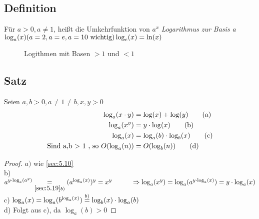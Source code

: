 \subsection{Definition}
Für $a > 0, a \neq 1$, hei\ss t die Umkehrfunktion von $a^x$ \emph{Logarithmus zur Basis a} \\
$\log_a (x) \hfill (a =2,a=e,a=10 \text{ wichtig})\\
\log_e (x) = \ln (x)\\
$
\begin{figure}[h!]
\centering
{}
\caption{Logithmen mit Basen $>1$ und $<1$}
\end{figure}
\subsection[Satz]{Satz}
Seien $a,b > 0 , a \neq 1 \neq b , x , y > 0$
\begin{align}
\log_a(x\cdot y) &= \log(x) + \log(y) \tag{a}\\
\log_a(x^y) &= y \cdot \log(x) \tag{b}\\
\log_a(x) &= \log_a(b) \cdot \log_b(x) \tag{c}\\
\text{Sind a,b > 1 , so } O(\log_a(n)) &= O(\log_b(n)) \tag{d}
\end{align}
\begin{proof}
$a)$ wie \ref{sec:5.10}\\
b) $a^{y \cdot \log_a(a^y)} \underset{\ref{sec:5.19}b)}{=}(a^{\log_a(x)})^{y} = x^y\\
\hspace*{1cm} \Rightarrow \log_a(x^y) = \log_a(a^{y \cdot \log_a(x)}) = y \cdot \log_a(x)$\\
c) $\log_a(x) = \log_a(b^{\log_a(x)}) \overset{b)}{=} \log_b(x) \cdot \log_a(b)$\\
d) Folgt aus c), da $\log_a(b) > 0$
\end{proof}
